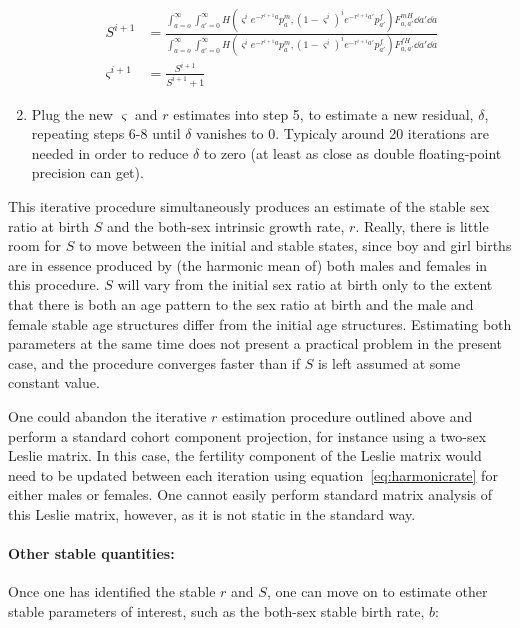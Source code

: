 \begin{enumerate}
  \begin{align}
  S^{i+1} &= \frac{\int_{a=o}^\infty \int_{a'=0}^\infty H(\varsigma^i
  e^{-r^{i+1}a} p_a^m, (1-\varsigma^i)^i e^{-r^{i+1}a'}p_{a'}^f) F_{a,a'}^{mH} \dd a' \dd a
  }{\int_{a=o}^\infty \int_{a'=0}^\infty H(\varsigma^i e^{-r^{i+1}a}
  p_a^m, (1-\varsigma^i)^i e^{-r^{i+1}a'}p_{a'}^f) F_{a,a'}^{fH} \dd a' \dd a }
  \\
  \varsigma^{i+1} &= \frac{S^{i+1}}{S^{i+1}+1}
  \end{align}
  \item Plug the new $\varsigma$ and $r$ estimates into step 5, to estimate a
  new residual, $\delta$, repeating steps 6-8 until $\delta$ vanishes to 0.
  Typicaly around 20 iterations are needed in order to reduce $\delta$ to
  zero (at least as close as double floating-point precision can get).
\end{enumerate}

This iterative procedure simultaneously produces an estimate of the stable
sex ratio at birth $S$ and the both-sex intrinsic growth rate, $r$. Really,
there is little room for $S$ to move between the initial and stable states,
since boy and girl births are in essence produced by (the harmonic mean of) both
males and females in this procedure. $S$
will vary from the initial sex ratio at birth only to the extent that there is
both an age pattern to the sex ratio at birth and the male and female stable age
structures differ from the initial age structures. Estimating both parameters at
the same time does not present a practical problem in the present case, and the
procedure converges faster than if $S$ is left assumed at some constant value.

One could abandon the iterative $r$ estimation procedure outlined above
and perform a standard cohort component projection, for instance using a
two-sex Leslie matrix. In this case, the fertility component of the Leslie
matrix would need to be updated between each iteration using
equation~\ref{eq:harmonicrate} for either males or females. One cannot easily
perform standard matrix analysis of this Leslie matrix, however, as it is not static in the standard way.

\paragraph{Other stable quantities: } Once one has identified the stable $r$ and
$S$, one can move on to estimate other stable parameters of interest, such as
the both-sex stable birth rate, $b$:

